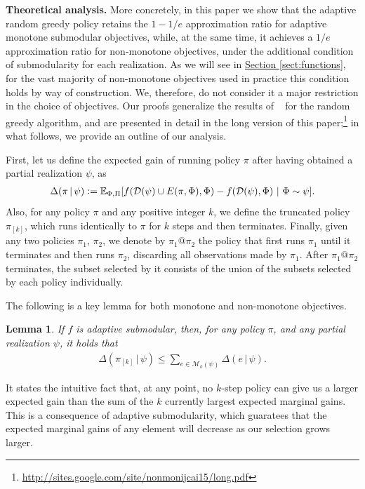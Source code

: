 \documentclass{article}
\newcommand{\sectref}[1]{\hyperref[#1]{Section \ref*{#1}}}
\newtheorem{lemma}{Lemma}
\newcommand{\defeq}{\vcentcolon=}
\newcommand{\mmid}{\,\vert\,}
\newcommand{\D}[2]{\Delta(#1\mmid#2)}
\newcommand{\pik}{\pi_{[k]}}
\newcommand{\dom}{\mathcal{D}}
\newcommand{\Mk}{\mathcal{M}_k}
\newcommand{\citet}[1]{\citeauthor{#1}~\shortcite{#1}}
\renewcommand{\paragraph}[1]{\vspace{0.3em}\noindent\textbf{#1.}\makebox[0.5em]{}}
\begin{document}
\paragraph{Theoretical analysis}
More concretely, in this paper we show that the adaptive random greedy policy retains the $1-1/e$ approximation ratio for adaptive monotone submodular objectives, while, at the same time, it achieves a $1/e$ approximation ratio for non-monotone objectives, under the additional condition of submodularity for each realization.
As we will see in \sectref{sect:functions}, for the vast majority of non-monotone objectives used in practice this condition holds by way of construction.
We, therefore, do not consider it a major restriction in the choice of objectives.
Our proofs generalize the results of \citet{buchbinder14} for the random greedy algorithm, and are presented in detail in the long version of this paper;\footnote{\url{http://sites.google.com/site/nonmonijcai15/long.pdf}} in what follows, we provide an outline of our analysis.

First, let us define the expected gain of running policy $\pi$ after having obtained a partial realization $\psi$, as
{\small
\begin{align*}
  \D{\pi}{\psi} \defeq \E[\Phi,\Pi]{f(\dom(\psi) \cup E(\pi, \Phi), \Phi) - f(\dom(\psi), \Phi)}[\Phi \sim \psi].
\end{align*}}
Also, for any policy $\pi$ and any positive integer $k$, we define the truncated policy $\pik$, which runs identically to $\pi$ for $k$ steps and then terminates.
Finally, given any two policies $\pi_1$, $\pi_2$, we denote by $\pi_1@\pi_2$ the policy that first runs $\pi_1$ until it terminates and then runs $\pi_2$, discarding all observations made by $\pi_1$.
After $\pi_1@\pi_2$ terminates, the subset selected by it consists of the union of the subsets selected by each policy individually.

The following is a key lemma for both monotone and non-monotone objectives.
\setcounter{lemma}{0}
\begin{lemma}\label{lem:submod}
  If $f$ is adaptive submodular, then, for any policy $\pi$, and any partial realization $\psi$, it holds that
  \begin{align*}
    \D{\pik}{\psi} \leq \sum_{e \in \Mk(\psi)} \D{e}{\psi}.
  \end{align*}
\end{lemma}
\noindent It states the intuitive fact that, at any point, no $k$-step policy can give us a larger expected gain than the sum of the $k$ currently largest expected marginal gains.
This is a consequence of adaptive submodularity, which guaratees that the expected marginal gains of any element will decrease as our selection grows larger.
\end{document}
